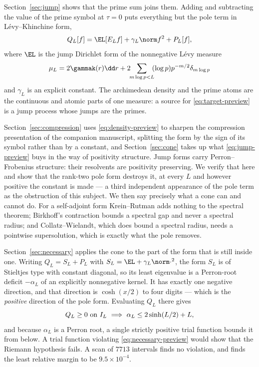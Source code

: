 Section~\ref{sec:jump} shows that the prime sum joins them. Adding and
subtracting the value of the prime symbol at $\tau=0$ puts everything but the
pole term in L\'evy--Khinchine form,
\begin{equation}\label{eq:jump-preview}
 Q_L[f]=\EL[E_Lf]+\gamma_L\norm f^2+P_L[f],
\end{equation}
where $\EL$ is the jump Dirichlet form of the nonnegative L\'evy measure
\begin{equation}\label{eq:measure-preview}
 \mu_L=2\gammak(r)\dd r+2\!\!\sum_{m\log p<L}\!\!(\log p)p^{-m/2}\delta_{m\log p}
\end{equation}
and $\gamma_L$ is an explicit constant. The archimedean density and the prime
atoms are the continuous and atomic parts of one measure: a source for
\eqref{eq:target-preview} is a jump process whose jumps are the primes.

Section~\ref{sec:compression} uses \eqref{eq:density-preview} to sharpen the
compression presentation of the companion manuscript, splitting the form by the
sign of its symbol rather than by a constant, and Section~\ref{sec:cone} takes
up what \eqref{eq:jump-preview} buys in the way of positivity structure. Jump
forms carry Perron--Frobenius structure: their resolvents are positivity
preserving. We verify that here and show that the rank-two pole form destroys
it, at every $L$ and however positive the constant is made --- a third
independent appearance of the pole term as the obstruction of this subject. We
then say precisely what a cone can and cannot do. For a self-adjoint form
Krein--Rutman adds nothing to the spectral theorem; Birkhoff's contraction
bounds a spectral gap and never a spectral radius; and Collatz--Wielandt, which
does bound a spectral radius, needs a pointwise supersolution, which is exactly
what the pole removes.

Section~\ref{sec:necessary} applies the cone to the part of the form that is
still inside one. Writing $Q_L=S_L+P_L$ with $S_L=\EL+\gamma_L\norm\cdot^2$, the
form $S_L$ is of Stieltjes type with constant diagonal, so its least eigenvalue
is a Perron-root deficit $-\alpha_L$ of an explicitly nonnegative kernel. It has
exactly one negative direction, and that direction is $\cosh(x/2)$ to four
digits --- which is the \emph{positive} direction of the pole form. Evaluating
$Q_L$ there gives
\begin{equation}\label{eq:necessary-preview}
 Q_L\geq0\ \hbox{on}\ I_L\ \Longrightarrow\ \alpha_L\leq2\sinh(L/2)+L,
\end{equation}
and because $\alpha_L$ is a Perron root, a single strictly positive trial
function bounds it from below. A trial function violating
\eqref{eq:necessary-preview} would show that the Riemann hypothesis fails. A
scan of $7713$ intervals finds no violation, and finds the least relative margin
to be $9.5\times10^{-4}$.

